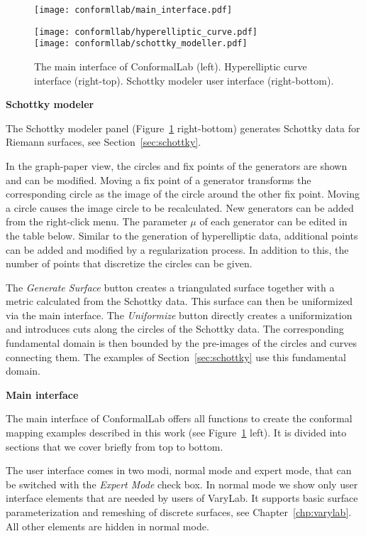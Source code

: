 \documentclass[Thesis.tex]{subfiles}
\begin{document}
\begin{figure}
\centering
\texttt{[image: conformllab/main\_interface.pdf]}\hfill
\begin{minipage}[b]{0.5\linewidth}
\texttt{[image: conformllab/hyperelliptic\_curve.pdf]}\\
\vskip 0.1cm
\texttt{[image: conformllab/schottky\_modeller.pdf]}
\end{minipage}
\caption{The main interface of {\sc ConformalLab} (left). Hyperelliptic curve interface (right-top).
Schottky modeler user interface (right-bottom).}
\label{fig:conformal_main_generators}
\end{figure}

{\bf Schottky modeler}

The Schottky modeler panel (Figure~\ref{fig:conformal_main_generators} right-bottom) generates Schottky data for Riemann surfaces, see Section~\ref{sec:schottky}. 

In the graph-paper view, the circles and fix points of the generators are shown and can be modified. 
Moving a fix point of a generator transforms the corresponding circle as the image of the circle around the other fix point. 
Moving a circle causes the image circle to be recalculated. 
New generators can be added from the right-click menu. 
The parameter $\mu$ of each generator can be edited in the table below.
Similar to the generation of hyperelliptic data, additional points can be added and modified by a regularization process. 
In addition to this, the number of points that discretize the circles can be given.

The \emph{Generate Surface} button creates a triangulated surface together with a metric calculated from the Schottky data. 
This surface can then be uniformized via the main interface. 
The \emph{Uniformize} button directly creates a uniformization and introduces cuts along the circles of the Schottky data. 
The corresponding fundamental domain is then bounded by the pre-images of the circles and curves connecting them.
The examples of Section~\ref{sec:schottky} use this fundamental domain.

{\bf Main interface}

The main interface of {\sc ConformalLab} offers all functions to create the conformal mapping examples described in this work (see Figure~\ref{fig:conformal_main_generators} left). 
It is divided into sections that we cover briefly from top to bottom. 

The user interface comes in two modi, normal mode and expert mode, that can be switched with the \emph{Expert Mode} check box. 
In normal mode we show only user interface elements that are needed by users of {\sc VaryLab}.
It supports basic surface parameterization and remeshing of discrete surfaces, see Chapter~\ref{chp:varylab}. 
All other elements are hidden in normal mode.
\end{document}
